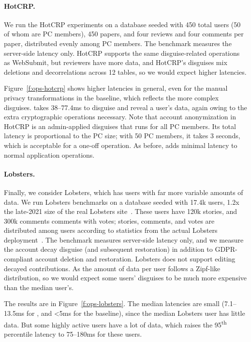 \paragraph{HotCRP.}
%
We run the HotCRP experiments on a database seeded with 450 total users (50 of
whom are PC members), 450 papers, and four reviews and four comments per paper,
distributed evenly among PC members.
%
The benchmark measures the server-side latency only.
%
HotCRP supports the same disguise-related operations as WebSubmit, but reviewers
have more data, and HotCRP's disguises mix deletions and decorrelations across
12 tables, so we would expect higher latencies.
%

%
Figure~\ref{f:ops-hotcrp} shows higher latencies in general, even for the manual
privacy transformations in the baseline, which reflects the more complex
disguises.
%
\sys takes 38--77.4ms to disguise and reveal a user's data, again owing to the
extra cryptographic operations necessary.
%
Note that account anonymization in HotCRP is an admin-applied disguises that
runs for all PC members.
%
Its total latency is proportional to the PC size; \eg with 50 PC members, it takes
3 seconds, which is acceptable for a one-off operation.
%
As before, \sys adds minimal latency to normal application operations.
%

\paragraph{Lobsters.}
%
Finally, we consider Lobsters, which has users with far more variable amounts of
data.
%
We run Lobsters benchmarks on a database seeded with 17.4k users, 1.2x the
late-2021 size of the real Lobsters site~\cite{lobsters}.
%
These users have 120k stories, and 300k comments comments with votes;
stories, comments, and votes are distributed among users according to
statistics from the actual Lobsters deployment~\cite{lobsters-data}.
%
The benchmark measures server-side latency only, and we measure the account
decay disguise (and subsequent restoration) in addition to GDPR-compliant
account deletion and restoration.
%
Lobsters does not support editing decayed contributions.
%
As the amount of data per user follows a Zipf-like distribution, so we would
expect some users' disguises to be much more expensive than the median user's.
%

%
The results are in Figure~\ref{f:ops-lobsters}.
%
The median latencies are small (7.1--13.5ms for \sys, and <5ms for the
baseline), since the median Lobsters user has little data.
%
But some highly active users have a lot of data, which raises the
95\textsuperscript{th} percentile latency to 75--180ms for these users.
%

